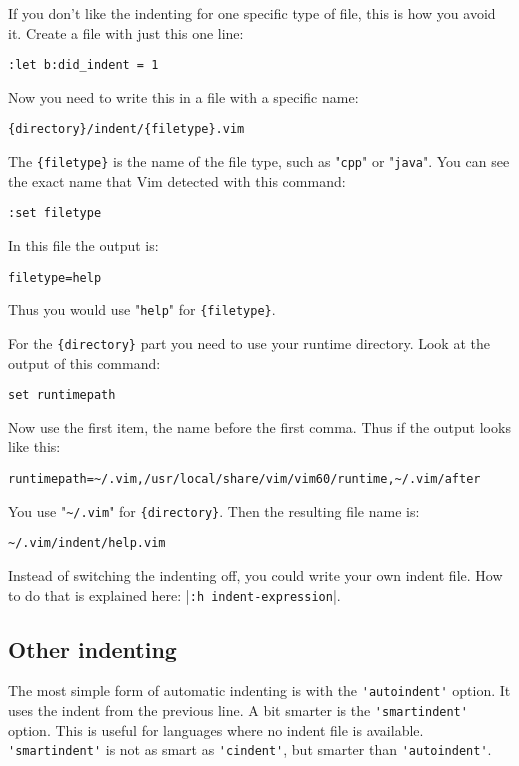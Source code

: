 If you don't like the indenting for one specific type of file, this is how you avoid it.
Create a file with just this one line:

\begin{Verbatim}[samepage=true]
 :let b:did_indent = 1
\end{Verbatim}

Now you need to write this in a file with a specific name:

\begin{Verbatim}[samepage=true]
    {directory}/indent/{filetype}.vim
\end{Verbatim}

The \verb!{filetype}! is the name of the file type, such as "\verb!cpp!" or "\verb!java!".
You can see the exact name that Vim detected with this command:

\begin{Verbatim}[samepage=true]
 :set filetype
\end{Verbatim}

In this file the output is:

\begin{Verbatim}[samepage=true]
    filetype=help 
\end{Verbatim}

Thus you would use "\verb!help!" for \verb!{filetype}!.

For the \verb!{directory}! part you need to use your runtime directory.
Look at the output of this command:

\begin{Verbatim}[samepage=true]
 set runtimepath
\end{Verbatim}

Now use the first item, the name before the first comma.
Thus if the output looks like this:

\begin{Verbatim}[samepage=true]
    runtimepath=~/.vim,/usr/local/share/vim/vim60/runtime,~/.vim/after 
\end{Verbatim}

You use "\verb!~/.vim!" for \verb!{directory}!.
Then the resulting file name is:

\begin{Verbatim}[samepage=true]
    ~/.vim/indent/help.vim 
\end{Verbatim}

Instead of switching the indenting off, you could write your own indent file.
How to do that is explained here: |\verb!:h indent-expression!|.
\subsection{Other indenting}
The most simple form of automatic indenting is with the \verb!'autoindent'! option.
It uses the indent from the previous line.
A bit smarter is the \verb!'smartindent'! option.
This is useful for languages where no indent file is available.
\verb!'smartindent'! is not as smart as \verb!'cindent'!, but smarter than \verb!'autoindent'!.

